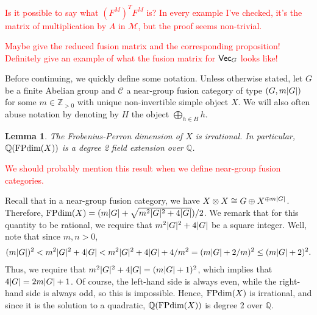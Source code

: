 \documentclass[12pt, reqno]{amsart}
\numberwithin{equation}{section}
\theoremstyle{plainspace}
\newtheorem{lemma}[theorem]{Lemma}
\theoremstyle{definitionspace}
\theoremstyle{remarkspace}
\renewenvironment{proof}{{\noindent\textbf{Proof.}}}{\null\hfill\qedsymbol}
\DeclarePairedDelimiter{\abs}{\lvert}{\rvert}
\newcommand{\mathcat}[1]{\mathcal{#1}}
\newcommand{\textcat}[1]{\textup{\textsf{#1}}}
\newcommand{\FPdim}{\textup{FPdim}}
\begin{document}
\noindent \textcolor{red}{Is it possible to say what $(F^M)^T F^M$ is? In every example I've checked, it's the matrix of multiplication by $A$ in $\mathcat{M}$, but the proof seems non-trivial.}
\newline

\noindent \textcolor{red}{Maybe give the reduced fusion matrix and the corresponding proposition! Definitely give an example of what the fusion matrix for $\textcat{Vec}_G$ looks like!}
\newline

\noindent Before continuing, we quickly define some notation. Unless otherwise stated, let $G$ be a finite Abelian group and $\mathcat{C}$ a near-group fusion category of type $(G, m\abs{G})$ for some $m \in \mathbb{Z}_{>0}$ with unique non-invertible simple object $X$. We will also often abuse notation by denoting by $H$ the object $\bigoplus_{h \in H}{h}$.
\newline

\begin{lemma}\label{lem:near-group_non-invertible_irrational}
The Frobenius-Perron dimension of $X$ is irrational. In particular, $\mathbb{Q}(\FPdim(X))$ is a degree 2 field extension over $\mathbb{Q}$.
\end{lemma}
\leavevmode

\noindent \textcolor{red}{We should probably mention this result when we define near-group fusion categories.}
\newline

\begin{proof}
Recall that in a near-group fusion category, we have $X \otimes X \cong G \oplus X^{\oplus m\abs{G}}$. Therefore, $\FPdim(X) = (m\abs{G} + \sqrt{m^2\abs{G}^2 + 4\abs{G}})/2$. We remark that for this quantity to be rational, we require that $m^2\abs{G}^2 + 4\abs{G}$ be a square integer. Well, note that since $m, n > 0$,
\begin{align*}
\begin{split}
(m\abs{G})^2 < m^2\abs{G}^2 + 4\abs{G} < m^2\abs{G}^2 + 4\abs{G} + 4/m^2 = (m\abs{G} + 2/m)^2 \leq (m\abs{G} + 2)^2.
\end{split}
\end{align*}
Thus, we require that $m^2\abs{G}^2 + 4\abs{G} = (m\abs{G} + 1)^2$, which implies that $4\abs{G} = 2m\abs{G} + 1$. Of course, the left-hand side is always even, while the right-hand side is always odd, so this is impossible. Hence, $\FPdim(X)$ is irrational, and since it is the solution to a quadratic, $\mathbb{Q}(\FPdim(X))$ is degree 2 over $\mathbb{Q}$.
\end{proof}
\newline
\end{document}
